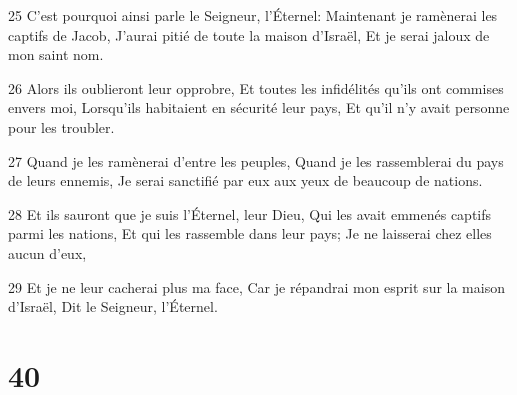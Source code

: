 \par 25 C'est pourquoi ainsi parle le Seigneur, l'Éternel: Maintenant je ramènerai les captifs de Jacob, J'aurai pitié de toute la maison d'Israël, Et je serai jaloux de mon saint nom.
\par 26 Alors ils oublieront leur opprobre, Et toutes les infidélités qu'ils ont commises envers moi, Lorsqu'ils habitaient en sécurité leur pays, Et qu'il n'y avait personne pour les troubler.
\par 27 Quand je les ramènerai d'entre les peuples, Quand je les rassemblerai du pays de leurs ennemis, Je serai sanctifié par eux aux yeux de beaucoup de nations.
\par 28 Et ils sauront que je suis l'Éternel, leur Dieu, Qui les avait emmenés captifs parmi les nations, Et qui les rassemble dans leur pays; Je ne laisserai chez elles aucun d'eux,
\par 29 Et je ne leur cacherai plus ma face, Car je répandrai mon esprit sur la maison d'Israël, Dit le Seigneur, l'Éternel.

\chapter{40}

